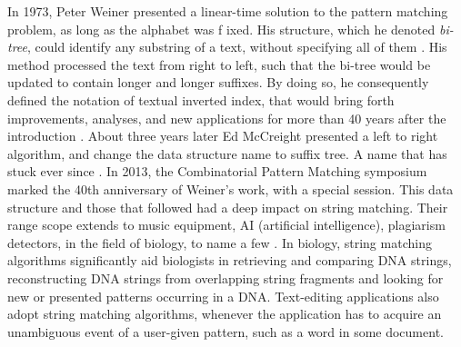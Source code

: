 \documentclass[12pt]{article} %
\begin{document}
In 1973, Peter Weiner presented a linear-time solution to the pattern matching problem, as long as the alphabet was f
ixed. His structure, which he denoted \emph{bi-tree}, could identify any substring of a text, without specifying all of them \cite{apostolico201640}. His method processed the text from right to left,  such that the bi-tree would be updated to contain longer and longer suffixes. By doing so, he consequently defined the notation of textual inverted index, that would bring forth improvements, analyses, and new applications for more than 40 years after the introduction \cite{apostolico201640}. About three years later Ed McCreight presented a left to right algorithm, and change the data structure name to suffix tree. A name that has stuck ever since \cite{ apostolico201640}. In 2013, the Combinatorial Pattern Matching symposium marked the 40th anniversary of Weiner’s work, with a special session. This data structure and those that followed had a deep impact on string matching. Their range scope extends to music equipment, AI (artificial intelligence), plagiarism detectors, in the field of biology, to name a few \cite{detection, apostolico201640}. In biology, string matching algorithms significantly aid biologists in retrieving and comparing DNA strings, reconstructing DNA strings from overlapping string fragments and looking for new or presented patterns occurring in a DNA\cite{gusfield}. Text-editing applications also adopt string matching algorithms, whenever the application has to acquire an unambiguous event of a user-given pattern, such as a word in some document\cite{introduction, gusfield}. \\ \\
\end{document}
